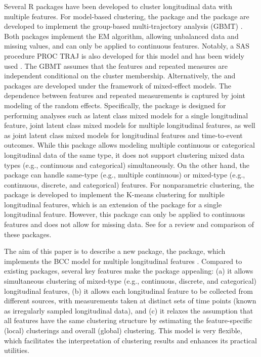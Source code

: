 Several R packages have been developed to cluster longitudinal data with multiple features. For model-based clustering, the  package \citep{Magrini2022} and the  package \citep{Leisch2004} are developed to implement the group-based multi-trajectory analysis (GBMT) \citep{Nagin2018, Magrini2022a}. Both packages implement the EM algorithm, allowing unbalanced data and missing values, and can only be applied to continuous features. Notably, a SAS procedure PROC TRAJ is also developed for this model and has been widely used \citep{Nagin2018}. The GBMT assumes that the features and repeated measures are independent conditional on the cluster membership. Alternatively, the  and  packages are developed under the framework of mixed-effect models. The dependence between features and repeated measurements is captured by joint modeling of the random effects. Specifically, the  package is designed for performing analyses such as latent class mixed models for a single longitudinal feature, joint latent class mixed models for multiple longitudinal features, as well as joint latent class mixed models for longitudinal features and time-to-event outcomes. While this package allows modeling multiple continuous or categorical longitudinal data of the same type, it does not support clustering mixed data types (e.g., continuous and categorical) simultaneously. On the other hand, the  package can handle same-type (e.g., multiple continuous) or mixed-type (e.g., continuous, discrete, and categorical) features. For nonparametric clustering, the  package \citep{Genolini2013} is developed to implement the K-means clustering for multiple longitudinal features, which is an extension of the  package \citep{Genolini2010} for a single longitudinal feature. However, this package can only be applied to continuous features and does not allow for missing data. See \citet{Lu2023} for a review and comparison of these packages.

The aim of this paper is to describe a new package, the  package, which implements the BCC model for multiple longitudinal features \citep{Lu2022,Tan2022a}. Compared to existing packages, several key features make the  package appealing: (a) it allows simultaneous clustering of mixed-type (e.g., continuous, discrete, and categorical) longitudinal features, (b) it allows each longitudinal feature to be collected from different sources, with measurements taken at distinct sets of time points (known as irregularly sampled longitudinal data), and (c) it relaxes the assumption that all features have the same clustering structure by estimating the feature-specific (local) clusterings and overall (global) clustering. This model is very flexible, which facilitates the interpretation of clustering results and enhances its practical utilities. 

